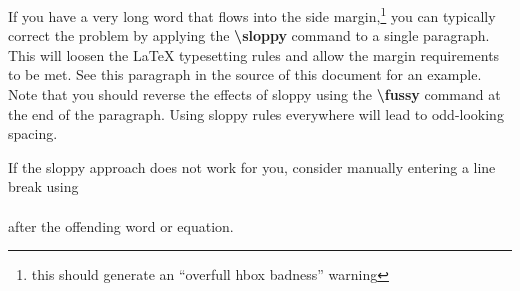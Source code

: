 \documentclass[master]{thesis}
\begin{document}
\sloppy
If you have a very long word that flows into the side margin,\footnote{this should generate an ``overfull hbox badness'' warning} you can typically correct the problem by applying the \textbf{\textbackslash sloppy} command to a single paragraph.  This will loosen the \LaTeX{} typesetting rules and allow the margin requirements to be met.  See this paragraph in the source of this document for an example.  Note that you should reverse the effects of sloppy using the \textbf{\textbackslash fussy} command at the end of the paragraph.  Using sloppy rules everywhere will lead to odd-looking spacing.
\fussy

If the sloppy approach does not work for you, consider manually entering a line break using \\\\ after the offending word or equation.

\backmatter %




\appendix %
\end{document}
